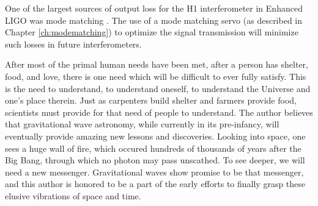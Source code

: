 One of the largest sources of output loss for the H1 interferometer in Enhanced LIGO was mode matching \cite{Tobin}. %
The use of a mode matching servo (as described in Chapter \ref{ch:modematching}) to optimize the signal transmission will minimize such losses in future interferometers.

After most of the primal human needs have been met, after a person has shelter, food, and love, there is one need which will be difficult to ever fully satisfy. %
This is the need to understand, to understand oneself, to understand the Universe and one's place therein. %
Just as carpenters build shelter and farmers provide food, scientists must provide for that need of people to understand. %
The author believes that gravitational wave astronomy, while currently in its pre-infancy, will eventually provide amazing new lessons and discoveries. %
Looking into space, one sees a huge wall of fire, which occured hundreds of thousands of years after the Big Bang, through which no photon may pass unscathed. %
To see deeper, we will need a new messenger. %
Gravitational waves show promise to be that messenger, and this author is honored to be a part of the early efforts to finally grasp these elusive vibrations of space and time.
